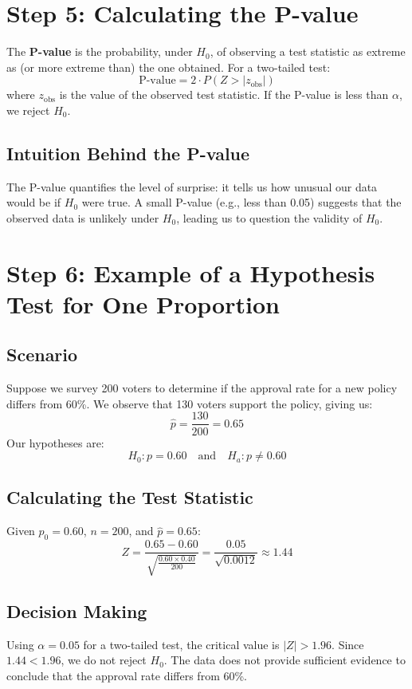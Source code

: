\documentclass[11pt]{article}
\begin{document}
\section*{Step 5: Calculating the P-value}

The \textbf{P-value} is the probability, under \( H_0 \), of observing a test statistic as extreme as (or more extreme than) the one obtained. For a two-tailed test:
\[
\text{P-value} = 2 \cdot P(Z > |z_{\text{obs}}|)
\]
where \( z_{\text{obs}} \) is the value of the observed test statistic. If the P-value is less than \( \alpha \), we reject \( H_0 \).

\subsection*{Intuition Behind the P-value}

The P-value quantifies the level of surprise: it tells us how unusual our data would be if \( H_0 \) were true. A small P-value (e.g., less than 0.05) suggests that the observed data is unlikely under \( H_0 \), leading us to question the validity of \( H_0 \).

\section*{Step 6: Example of a Hypothesis Test for One Proportion}

\subsection*{Scenario}
Suppose we survey 200 voters to determine if the approval rate for a new policy differs from 60\%. We observe that 130 voters support the policy, giving us:
\[
\hat{p} = \frac{130}{200} = 0.65
\]
Our hypotheses are:
\[
H_0: p = 0.60 \quad \text{and} \quad H_a: p \neq 0.60
\]

\subsection*{Calculating the Test Statistic}
Given \( p_0 = 0.60 \), \( n = 200 \), and \( \hat{p} = 0.65 \):
\[
Z = \frac{0.65 - 0.60}{\sqrt{\frac{0.60 \times 0.40}{200}}} = \frac{0.05}{\sqrt{0.0012}} \approx 1.44
\]

\subsection*{Decision Making}
Using \( \alpha = 0.05 \) for a two-tailed test, the critical value is \( |Z| > 1.96 \). Since \( 1.44 < 1.96 \), we do not reject \( H_0 \). The data does not provide sufficient evidence to conclude that the approval rate differs from 60\%.
\end{document}
